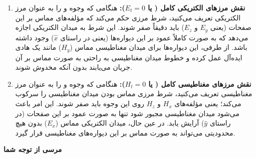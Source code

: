 \documentclass{article}
\begin{document}
	\begin{enumerate}
		\item \textbf{نقش مرزهای الکتریکی کامل ( یا $E_t=0$):} 
		هنگامی که وجوه  و  را به عنوان مرز الکتریکی تعریف می‌کنید، شرط مرزی حکم می‌کند که مؤلفه‌های مماس بر این صفحات (یعنی $E_y$ و $E_z$) باید دقیقاً صفر شوند. این شرط به میدان الکتریکی اجازه می‌دهد که به صورت کاملاً عمود بر این دیواره‌ها (یعنی در راستای $\hat{x}$) وجود داشته باشد. از طرفی، این دیواره‌ها برای میدان مغناطیسی مماس ($H_y$) مانند یک هادی ایده‌آل عمل کرده و خطوط میدان مغناطیسی به راحتی به صورت مماس بر آن جریان می‌یابند بدون آنکه مخدوش شوند.
		
		\item \textbf{نقش مرزهای مغناطیسی کامل ( یا $H_t=0$):}
		هنگامی که وجوه  و  را به عنوان مرز مغناطیسی تعریف می‌کنید، شرط مرزی مماس بودن میدان مغناطیسی را سرکوب می‌کند؛ یعنی مؤلفه‌های $H_x$ و $H_z$ روی این وجوه باید صفر شوند. این امر باعث می‌شود میدان مغناطیسی مجبور شود تنها به صورت عمود بر این صفحات (در راستای $\hat{y}$) آرایش یابد. در عین حال، میدان الکتریکی مماس ($E_x$) بدون هیچ محدودیتی می‌تواند به صورت مماس بر این دیواره‌های مغناطیسی قرار گیرد.
		

	\end{enumerate}
	
	
	\vfill
	\begin{flushleft}
		\Huge\textbf{مرسی از توجه شما}
	\end{flushleft}
\end{document}
